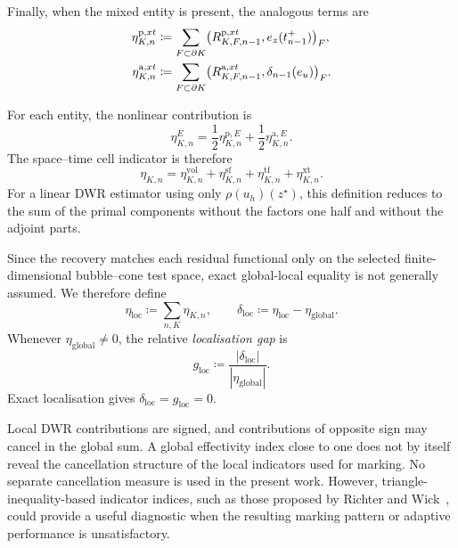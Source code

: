 Finally, when the mixed entity is present, the analogous terms are
\begin{align}
  \eta_{K,n}^{\mathrm p,xt}
  &\coloneqq
  \sum_{F\subset\partial K}
  \bigl(R_{K,F,n-1}^{\mathrm p,xt},
        e_z(t_{n-1}^+)\bigr)_F,
  \notag\\
  \eta_{K,n}^{\mathrm a,xt}
  &\coloneqq
  \sum_{F\subset\partial K}
  \bigl(R_{K,F,n-1}^{\mathrm a,xt},
        \delta_{n-1}(e_u)\bigr)_F.
  \label{eq:nonlinear-dwr-mixed-components}
\end{align}

For each entity, the nonlinear contribution is
\begin{equation}
  \eta_{K,n}^{E}
  =\frac12\eta_{K,n}^{\mathrm p,E}
   +\frac12\eta_{K,n}^{\mathrm a,E}.
  \label{eq:complete-nonlinear-entity-indicator}
\end{equation}
The space--time cell indicator is therefore
\begin{equation}
  \eta_{K,n}
  =\eta_{K,n}^{\mathrm{vol}}
   +\eta_{K,n}^{\mathrm{sf}}
   +\eta_{K,n}^{\mathrm{tf}}
   +\eta_{K,n}^{\mathrm{xt}}.
  \label{eq:complete-nonlinear-cell-indicator}
\end{equation}
For a linear DWR estimator using only $\rho(u_h)(z^\star)$, this definition reduces to the sum of the primal components without the factors one half and without the adjoint parts.

Since the recovery matches each residual functional only on the selected finite-dimensional bubble--cone test space, exact global-local equality is not generally assumed. We therefore define
\begin{equation}
  \eta_{\mathrm{loc}}
  \coloneqq
  \sum_{n,K}\eta_{K,n},
  \qquad
  \delta_{\mathrm{loc}}
  \coloneqq
  \eta_{\mathrm{loc}}-\eta_{\mathrm{global}}.
\end{equation}
Whenever $\eta_{\mathrm{global}}\neq0$, the relative \emph{localisation gap} is
\begin{equation}
  g_{\mathrm{loc}}
  \coloneqq
  \frac{|\delta_{\mathrm{loc}}|}
       {|\eta_{\mathrm{global}}|}.
\end{equation}
Exact localisation gives $\delta_{\mathrm{loc}}=g_{\mathrm{loc}}=0$.

\begin{remark}
Local DWR contributions are signed, and contributions of opposite sign may cancel in the global sum. A global effectivity index close to one does not by itself reveal the cancellation structure of the local indicators used for marking. No separate cancellation measure is used in the present work. However, triangle-inequality-based indicator indices, such as those proposed by Richter and Wick~\cite{Richter_Wick_2015}, could provide a useful diagnostic when the resulting marking pattern or adaptive performance is unsatisfactory.
\end{remark}
